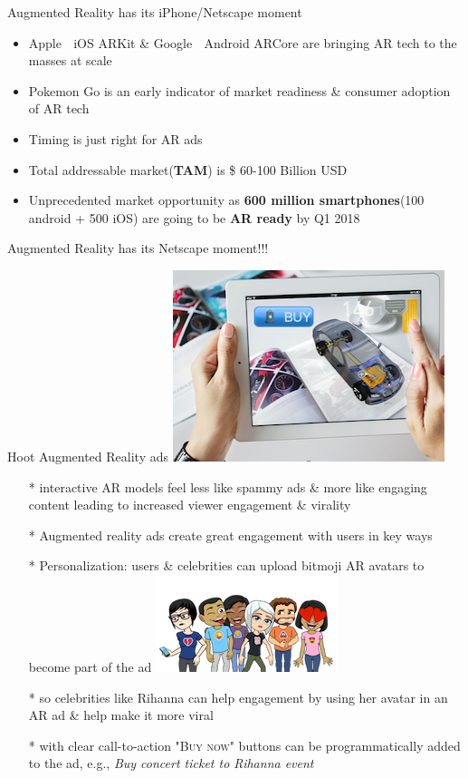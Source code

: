 \documentclass[10pt,handout]{beamer}
\begin{document}
\begin{frame}[t]{Augmented Reality has its iPhone/Netscape moment}
 \begin{itemize}[<+-| alert@+>]
	\item Apple 🍎
	 iOS ARKit \& Google 🤖 Android ARCore are bringing AR tech to the masses at scale
	\item Pokemon Go is an early indicator of market readiness \& consumer adoption of AR tech
	\item Timing is just right for AR ads
	\item Total addressable market(\textbf{TAM}) is \$ 60-100 Billion USD 
	\item Unprecedented market opportunity as \textbf{600 million smartphones}(100 android + 500 iOS)  are going to be \textbf{AR ready} by Q1 2018
\end{itemize}
\pause
\Large{Augmented Reality has its Netscape moment!!!}
\end{frame}
\begin{frame}[t]{Hoot Augmented Reality ads \includegraphics[scale=.1]{static/arad/arad5}} 
 \begin{itemize}[<+-| alert@+>]
\item[*]interactive AR models feel less like spammy ads \& more like engaging content leading to increased viewer engagement \& virality 
\item[*]Augmented reality ads create great engagement with users in key ways
\item[*]Personalization: users \& celebrities can upload bitmoji AR avatars to become part of the ad
\includegraphics[scale=.15]{static/arad/bitmoji} 
\item[*]so celebrities like Rihanna can help engagement by using her avatar in an AR ad \& help make it more viral 
\item[*]with clear call-to-action \textsc{"Buy now"} buttons can be programmatically added to the ad, e.g., \emph{ Buy concert ticket to Rihanna event}
\end{itemize}
\end{frame}
\end{document}
